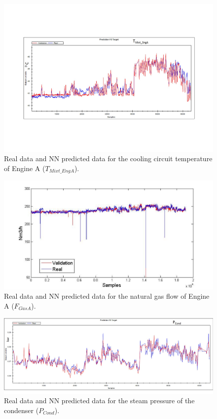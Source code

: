 \begin{figure}
\centering
\includegraphics[width=1\textwidth]{IrrigationA-ANN.pdf}
\caption{Real data and NN predicted data for the cooling circuit temperature of Engine A ($T_{Mixt\_EngA}$).}
\label{TcoolA}
\end{figure}

\begin{figure}
\centering
\includegraphics[width=1\textwidth]{ANNengineD.pdf}
\caption{Real data and NN predicted data for the natural gas flow  of Engine A ($F_{GasA}$).}
\label{FengineA}
\end{figure}

\begin{figure}
\centering
\includegraphics[width=1\textwidth]{ANN-STcond.pdf}
\caption{Real data and NN predicted data for the steam pressure of the condenser  ($P_{Cond}$).}
\label{Pcond}
\end{figure}

